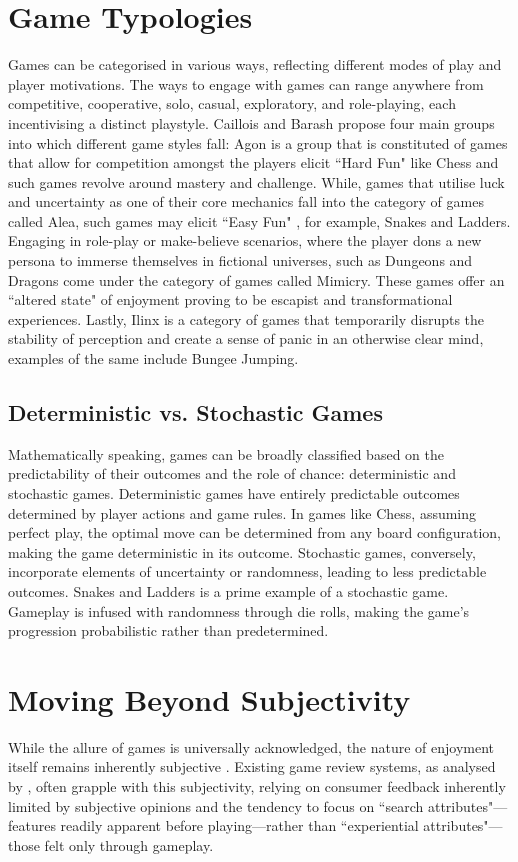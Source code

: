 \section{Game Typologies}
Games can be categorised in various ways, reflecting different modes of play and player motivations. The ways to engage with games can range anywhere from competitive, cooperative, solo, casual, exploratory, and role-playing, each incentivising a distinct playstyle.  Caillois and Barash \textcite{cailloisManPlayGames2001} propose four main groups into which different game styles fall: Agon is a group that is constituted of games that allow for competition amongst the players elicit ``Hard Fun" \autocite{lazzaroWhyWePlay2004a} like Chess and such games revolve around mastery and challenge. While, games that utilise luck and uncertainty as one of their core mechanics fall into the category of games called Alea, such games may elicit ``Easy Fun" \autocite{lazzaroWhyWePlay2004a}, for example, Snakes and Ladders. Engaging in role-play or make-believe scenarios, where the player dons a new persona to immerse themselves in fictional universes, such as Dungeons and Dragons come under the category of games called Mimicry. These games offer an ``altered state" \autocite{lazzaroWhyWePlay2004a} of enjoyment proving to be escapist and transformational experiences. Lastly, Ilinx is a category of games that temporarily disrupts the stability of perception and create a sense of panic in an otherwise clear mind, examples of the same include Bungee Jumping.


\subsection{Deterministic vs. Stochastic Games}
Mathematically speaking, games can be broadly classified based on the predictability of their outcomes and the role of chance: deterministic and stochastic games. Deterministic games have entirely predictable outcomes determined by player actions and game rules. In games like Chess, assuming perfect play, the optimal move can be determined from any board configuration, making the game deterministic in its outcome.  Stochastic games, conversely, incorporate elements of uncertainty or randomness, leading to less predictable outcomes. Snakes and Ladders is a prime example of a stochastic game.  Gameplay is infused with randomness through die rolls, making the game's progression probabilistic rather than predetermined.

\section{Moving Beyond Subjectivity}
While the allure of games is universally acknowledged, the nature of enjoyment itself remains inherently subjective \autocite{lazzaroWhyWePlay2004a}. Existing game review systems, as analysed by  \textcite{yangExperientialGoodsNetwork2010a}, often grapple with this subjectivity, relying on consumer feedback inherently limited by subjective opinions and the tendency to focus on ``search attributes"—features readily apparent before playing—rather than ``experiential attributes"—those felt only through gameplay.  


